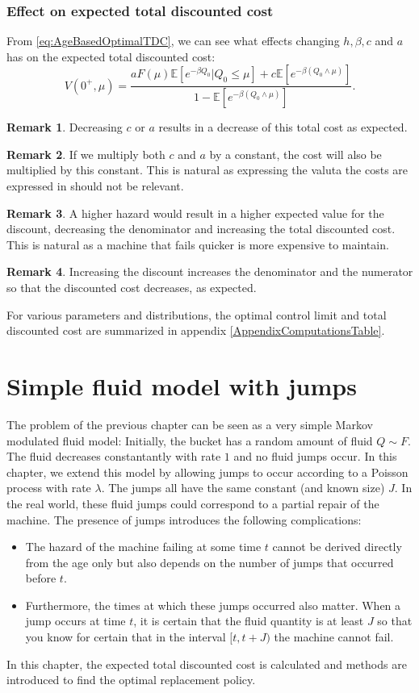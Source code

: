 \documentclass[a4paper]{thesis}
\theoremstyle{definition}
\newtheorem{remark}{Remark}[chapter]
\begin{document}
\subsection{Effect on expected total discounted cost}
From \eqref{eq:AgeBasedOptimalTDC}, we can see what effects changing $h,\beta,c$ and $a$ has on the expected total discounted cost:
\[V(0^+,\mu)=\frac{aF(\mu)\mathbb{E}[e^{-\beta Q_0}|Q_0\leq \mu]+c\mathbb{E}[e^{-\beta(Q_0\wedge\mu)}]}{1-\mathbb{E}[e^{-\beta (Q_0\wedge\mu)}]}.\]
\begin{remark}
	Decreasing $c$ or $a$ results in a decrease of this total cost as expected.
\end{remark}
\begin{remark}\label{remark:AgeBasedCostRatio}
	If we multiply both $c$ and $a$ by a constant, the cost will also be multiplied by this constant.
	This is natural as expressing the valuta the costs are expressed in should not be relevant.
\end{remark}
\begin{remark}
	A higher hazard would result in a higher expected value for the discount, decreasing the denominator and increasing the total discounted cost.
	This is natural as a machine that fails quicker is more expensive to maintain.
\end{remark}
\begin{remark}\label{remark:AgeBasedTDCDiscountIncrease}
	Increasing the discount increases the denominator and the numerator so that the discounted cost decreases, as expected.
\end{remark}
For various parameters and distributions, the optimal control limit and total discounted cost are summarized in appendix \ref{AppendixComputationsTable}. 
\chapter{Simple fluid model with jumps}\label{chapter:SimpleFluid}
The problem of the previous chapter can be seen as a very simple Markov modulated fluid model:
Initially, the bucket has a random amount of fluid $Q\sim F$.
The fluid decreases constantantly with rate $1$ and no fluid jumps occur.
In this chapter, we extend this model by allowing jumps to occur according to a Poisson process with rate $\lambda$.
The jumps all have the same constant (and known size) $J$.
In the real world, these fluid jumps could correspond to a partial repair of the machine.
The presence of jumps introduces the following complications:
\begin{itemize}
	\item The hazard of the machine failing at some time $t$ cannot be derived directly from the age only but also depends on the number of jumps that occurred before $t$.
	\item Furthermore, the times at which these jumps occurred also matter.
	When a jump occurs at time $t$, it is certain that the fluid quantity is at least $J$ so that you know for certain that in the interval $[t,t+J)$ the machine cannot fail.
\end{itemize}
In this chapter, the expected total discounted cost is calculated and methods are introduced to find the optimal replacement policy.
\end{document}
